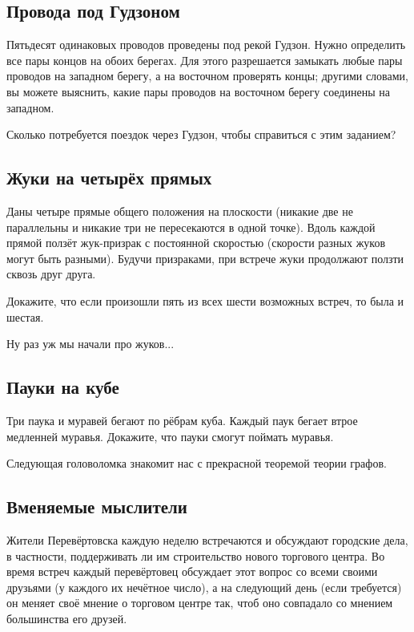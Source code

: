 \subsection*{Провода под Гудзоном}

Пятьдесят одинаковых проводов проведены под рекой Гудзон.
Нужно определить все пары концов на обоих берегах.
Для этого разрешается замыкать любые пары проводов на западном берегу, а на восточном проверять концы;
другими словами, вы можете выяснить, какие пары проводов на восточном берегу соединены на западном.

Сколько потребуется поездок через Гудзон, чтобы справиться с этим заданием?

\subsection*{Жуки на четырёх прямых}

Даны четыре прямые общего положения на плоскости (никакие две не параллельны и никакие три не пересекаются в одной точке).
Вдоль каждой прямой ползёт жук-призрак с постоянной скоростью (скорости разных жуков могут быть разными).
Будучи призраками, при встрече жуки продолжают ползти сквозь друг друга.

Докажите, что если произошли пять из всех шести возможных встреч,
то была и шестая.

\medskip

Ну раз уж мы начали про жуков...

\subsection*{Пауки на кубе}

Три паука и муравей бегают по рёбрам куба.
Каждый паук бегает втрое медленней муравья.
Докажите, что пауки смогут поймать муравья.

\medskip

Следующая головоломка знакомит нас с прекрасной теоремой теории графов.

\subsection*{Вменяемые мыслители}\label{Вменяемые мыслители}

Жители Перевёртовска каждую неделю встречаются и обсуждают городские дела, в частности, поддерживать ли им строительство нового торгового центра.
Во время встреч каждый перевёртовец обсуждает этот вопрос со всеми своими друзьями (у каждого их нечётное число), а на следующий день (если требуется) он меняет своё мнение о торговом центре так, чтоб оно совпадало со мнением большинства его друзей.

